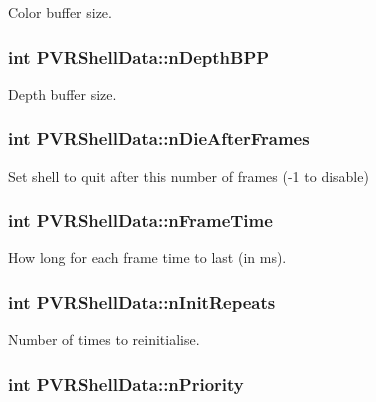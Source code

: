 Color buffer size. \hypertarget{struct_p_v_r_shell_data_a0adbe200c73f63fd21c5ad5479d56033}{
\subsubsection[{n\+Depth\+B\+P\+P}]{\setlength{\rightskip}{0pt plus 5cm}int P\+V\+R\+Shell\+Data\+::n\+Depth\+B\+P\+P}}\label{struct_p_v_r_shell_data_a0adbe200c73f63fd21c5ad5479d56033}
Depth buffer size. \hypertarget{struct_p_v_r_shell_data_a46494a2f4df91ac2e7e3ef2430b9ccf0}{
\subsubsection[{n\+Die\+After\+Frames}]{\setlength{\rightskip}{0pt plus 5cm}int P\+V\+R\+Shell\+Data\+::n\+Die\+After\+Frames}}\label{struct_p_v_r_shell_data_a46494a2f4df91ac2e7e3ef2430b9ccf0}
Set shell to quit after this number of frames (-\/1 to disable) \hypertarget{struct_p_v_r_shell_data_a2ec6998a67e0984762132b46bc86ced5}{
\subsubsection[{n\+Frame\+Time}]{\setlength{\rightskip}{0pt plus 5cm}int P\+V\+R\+Shell\+Data\+::n\+Frame\+Time}}\label{struct_p_v_r_shell_data_a2ec6998a67e0984762132b46bc86ced5}
How long for each frame time to last (in ms). \hypertarget{struct_p_v_r_shell_data_aaf4d946fde1e9a938ac709f6c8e5089e}{
\subsubsection[{n\+Init\+Repeats}]{\setlength{\rightskip}{0pt plus 5cm}int P\+V\+R\+Shell\+Data\+::n\+Init\+Repeats}}\label{struct_p_v_r_shell_data_aaf4d946fde1e9a938ac709f6c8e5089e}
Number of times to reinitialise. \hypertarget{struct_p_v_r_shell_data_ad1df1cdd6c70e9e90a007c7cd737b191}{
\subsubsection[{n\+Priority}]{\setlength{\rightskip}{0pt plus 5cm}int P\+V\+R\+Shell\+Data\+::n\+Priority}}\label{struct_p_v_r_shell_data_ad1df1cdd6c70e9e90a007c7cd737b191}
